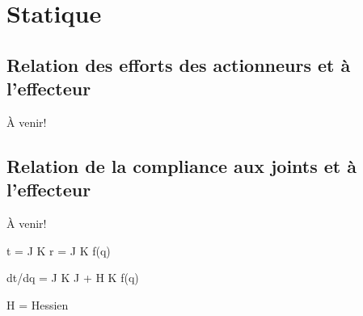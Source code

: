 \chapter{Statique}



\section{Relation des efforts des actionneurs et à l'effecteur}

À venir!


\section{Relation de la compliance aux joints et à l'effecteur}

À venir!

t = J K r = J K f(q)

dt/dq = J K J + H K f(q)

H = Hessien
